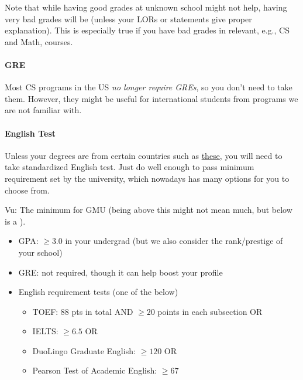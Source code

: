 \documentclass[11pt]{article}
\newenvironment{commentbox}{
 \small
    \begin{cbox}
 }{
   \end{cbox}
}
\newcommand{\red}[1]{{\color{red}{#1}}}
\begin{document}
Note that while having good grades at unknown school might not help,
having very bad grades will be \red{red flag} (unless your LORs or
statements give proper explanation). This is especially true if you
have bad grades in relevant, e.g., CS and Math, courses.

\paragraph{GRE} Most CS programs in the US \emph{no longer require GREs}, so you don't need to
take them. However, they might be useful for international students from programs we are not familiar with. 

\paragraph{English Test} Unless your degrees are from certain countries such as \href{https://github.com/dynaroars/dynaroars.github.io/wiki/About-GMU#standard-tests-waiver-eligible-countries}{these}, you will need to
take standardized English test. Just do well enough to pass minimum requirement set by the university, which nowadays has many options for you to choose from.

\begin{commentbox}
Vu: The minimum for GMU (being above this might not mean much, but below is a \red{red flag}).
\begin{itemize}
\item GPA: $\ge 3.0$ in your undergrad (but we also consider the rank/prestige of your school)
\item GRE: not required, though it can help boost your profile
\item English requirement tests (one of the below)
  \begin{itemize}    
  \item TOEF: 88 pts in total AND $\ge 20$ points in each subsection OR
  \item IELTS: $\ge 6.5$ OR
  \item DuoLingo Graduate English: $\ge 120$ OR 
  \item Pearson Test of Academic English: $\ge 67$
  \end{itemize}  
\end{itemize}
\end{commentbox}
\end{document}

